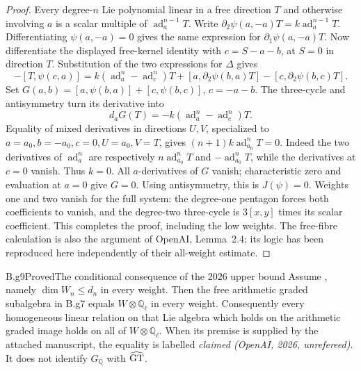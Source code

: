 \begin{proof}
Every degree-$n$ Lie polynomial linear in a free direction $T$ and
otherwise involving $a$ is a scalar multiple of
$\operatorname{ad}_a^{n-1}T$.  Write
$\partial_2\psi(a,-a)T=k\operatorname{ad}_a^{n-1}T$.
Differentiating $\psi(a,-a)=0$ gives the same expression for
$\partial_1\psi(a,-a)T$.
Now differentiate the displayed free-kernel identity with
$c=S-a-b$, at $S=0$ in direction $T$.  Substitution of the two
expressions for $\Delta$ gives
\[
 -[T,\psi(c,a)]
 =k(\operatorname{ad}_a^n-\operatorname{ad}_c^n)T
  +[a,\partial_2\psi(b,a)T]-[c,\partial_2\psi(b,c)T].
\]
Set $G(a,b)=[a,\psi(b,a)]+[c,\psi(b,c)]$, $c=-a-b$.
The three-cycle and antisymmetry turn its derivative into
\[
 d_aG(T)=-k(\operatorname{ad}_a^n-\operatorname{ad}_c^n)T.
\]
Equality of mixed derivatives in directions $U,V$, specialized to
$a=a_0,b=-a_0,c=0,U=a_0,V=T$, gives
$(n+1)k\operatorname{ad}_{a_0}^nT=0$.
Indeed the two derivatives of $\operatorname{ad}_a^n$ are respectively
$n\operatorname{ad}_{a_0}^nT$ and
$-\operatorname{ad}_{a_0}^nT$, while the derivatives at $c=0$ vanish.
Thus $k=0$.  All $a$-derivatives of $G$ vanish; characteristic zero and
evaluation at $a=0$ give $G=0$.
Using antisymmetry, this is $J(\psi)=0$.
Weights one and two vanish for the full system: the degree-one
pentagon forces both coefficients to vanish, and the degree-two
three-cycle is $3[x,y]$ times its scalar coefficient.
This completes the proof, including the low weights.  The free-fibre
calculation is also the argument of OpenAI, Lemma~2.4; its logic has
been reproduced here independently of their all-weight estimate.
\end{proof}

\begin{claim}{B.g9}{Proved}{The conditional consequence of the 2026 upper bound}
Assume \citet[Corollary~5.4]{OpenAI2026g}, namely $\dim W_n\leq d_n$ in every
weight.  Then the free arithmetic graded subalgebra in B.g7 equals
$W\otimes\mathbb Q_\ell$ in every weight.  Consequently every
homogeneous linear relation on that Lie algebra which holds on the
arithmetic graded image holds on all of $W\otimes\mathbb Q_\ell$.
When its premise is supplied by the attached manuscript, the equality
is labelled \emph{claimed (OpenAI, 2026, unrefereed)}.
It does not identify $G_{\mathbb Q}$ with $\widehat{\mathrm{GT}}$.
\end{claim}

